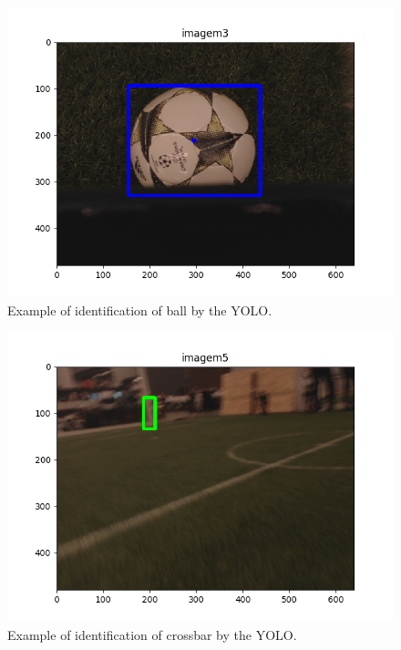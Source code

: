 \documentclass[journal,12pt,onecolumn,draftclsnofoot,]{IEEEtran}
\begin{document}
\begin{figure}
  \begin{center}
  \includegraphics[width=5in]{./../code/imagem3_detection.png}
  \caption{Example of identification of ball by the YOLO.}
  \label{img:classification_three}
  \end{center}
\end{figure}

\begin{figure}
  \begin{center}
  \includegraphics[width=5in]{./../code/imagem5_detection.png}
  \caption{Example of identification of crossbar by the YOLO.}
  \label{img:classification_four}
  \end{center}
\end{figure}
\end{document}
